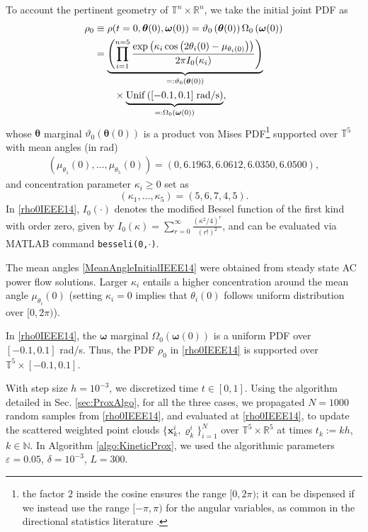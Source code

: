 \documentclass[10pt,twocolumn]{IEEEtran}
\begin{document}
To account the pertinent geometry of $\mathbb{T}^{n}\times\mathbb{R}^{n}$, we take the initial joint PDF as
\begin{align}
\rho_{0}&\equiv\rho(t=0,\bm{\theta}(0),\bm{\omega}(0)) = \vartheta_{0}\left(\bm{\theta}(0)\right)\Omega_{0}\left(\bm{\omega}(0)\right)\nonumber\\
&=\underbrace{\left(\prod_{i=1}^{n=5}\dfrac{\exp\left(\kappa_{i}\cos\left(2\theta_{i}(0)-\mu_{\theta_{i}(0)}\right)\right)}{2\pi I_{0}(\kappa_{i})}\right)}_{=:\vartheta_{0}\left(\bm{\theta}(0)\right)}\nonumber\\
	&\qquad\times \underbrace{{\rm{Unif}}\left([-0.1,0.1]\;\text{rad/s}\right)}_{=:\Omega_{0}\left(\bm{\omega}(0)\right)},
\label{rho0IEEE14}		
\end{align}
whose $\bm{\theta}$ marginal $ \vartheta_{0}\left(\bm{\theta}(0)\right)$ is a product von Mises PDF\footnote{the factor $2$ inside the cosine ensures the range $[0,2\pi)$; it can be dispensed if we instead use the range $[-\pi,\pi)$ for the angular variables, as common in the directional statistics literature \cite{mardia2009directional}.} \cite{mardia2008multivariate,mardia2014some} supported over $\mathbb{T}^{5}$ with mean angles (in rad)
\begin{align}
\left(\mu_{\theta_{1}}(0),\hdots,\mu_{\theta_{5}}(0)\right)=\left(0, 6.1963, 6.0612, 6.0350, 6.0500\right),
\label{MeanAngleInitialIEEE14}	
\end{align}
and concentration parameter $\kappa_{i}\geq 0$ set as 
\[(\kappa_{1},\hdots,\kappa_5) = \left(5,6,7,4,5\right).\]
In \eqref{rho0IEEE14}, $I_{0}(\cdot)$ denotes the modified Bessel function of the first kind with order zero, given by $I_{0}(\kappa) = \sum_{r=0}^{\infty} \frac{\left(\kappa^{2}/4\right)^{r}}{(r!)^{2}}$, and can be evaluated via MATLAB command \texttt{besseli(0,$\cdot$)}. 

The mean angles \eqref{MeanAngleInitialIEEE14} were obtained from steady state AC power flow solutions. Larger $\kappa_{i}$ entails a higher concentration around the mean angle $\mu_{\theta_{i}}(0)$ (setting $\kappa_i=0$ implies that $\theta_{i}(0)$ follows uniform distribution over $[0,2\pi)$).

In \eqref{rho0IEEE14}, the $\bm{\omega}$ marginal $ \Omega_{0}\left(\bm{\omega}(0)\right)$ is a uniform PDF over $[-0.1,0.1]$ rad/s. Thus, the PDF $\rho_0$ in \eqref{rho0IEEE14} is supported over $\mathbb{T}^{5}\times [-0.1,0.1]$.

With step size $h=10^{-3}$, we discretized time $t\in[0,1]$. Using the algorithm detailed in Sec. \ref{sec:ProxAlgo}, for all the three cases, we propagated $N=1000$ random samples from \eqref{rho0IEEE14}, and evaluated at \eqref{rho0IEEE14}, to update the scattered weighted point clouds $\{\bm{x}_{k}^{i},\varrho_{k}^{i}\}_{i=1}^{N}$ over $\mathbb{T}^{5}\times\mathbb{R}^{5}$ at times $t_{k}:=kh$, $k\in\mathbb{N}$. In Algorithm \ref{algo:KineticProx}, we used the algorithmic parameters $\varepsilon=0.05$, $\delta=10^{-3}$, $L=300$.
\end{document}

